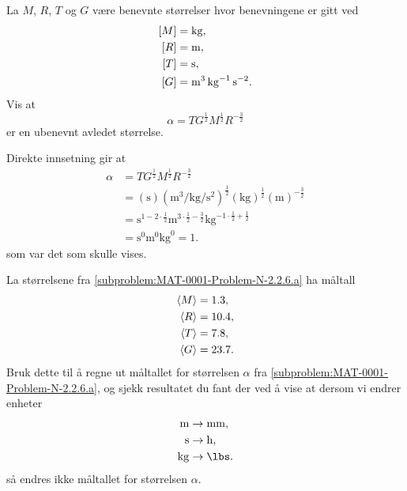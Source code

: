 \documentclass[a4paper,11pt]{article}
\begin{document}
\begin{problem}
    \begin{subproblem}
        \label{subproblem:MAT-0001-Problem-N-2.2.6.a}
        La $M$, $R$, $T$ og
        $G$ være benevnte størrelser hvor benevningene er
        gitt ved
        \begin{align*}
          \bpar{M} &= \si{\kg},\\
          \bpar{R} &= \si{\m},\\
          \bpar{T} &= \si{\s},\\
          \bpar{G} &= \si{\m\cubed\per\kg\per\s\squared}.
        \end{align*}
        Vis at
        \begin{equation*}
          \alpha = T G^{\frac{1}{2}} M^{\frac{1}{2}} R^{-\frac{3}{2}}
        \end{equation*}
        er en ubenevnt avledet størrelse.
    \end{subproblem}
\end{problem}
\begin{solution}
    Direkte innsetning gir at
    \begin{align*}
        \alpha 
        & = T G^{\frac{1}{2}} M^{\frac{1}{2}} R^{-\frac{3}{2}} \\
        & = (\si{\s})(\si{\m\cubed\per\kg\per\s\squared})^{\frac{1}{2}} (\si{\kg})^{\frac{1}{2}} (\si{\m})^{-\frac{3}{2}} \\
        & = \si{\s\tothe{1 - 2\cdot\frac{1}{2}}%
                \m\tothe{3 \cdot \frac{1}{2} - \frac{3}{2}}%
                \kg\tothe{-1\cdot\frac{1}{2}+\frac{1}{2}}} \\
        & = \si{\s\tothe{0}\m\tothe{0}\kg\tothe{0}}
          = 1.
    \end{align*}
    som var det som skulle vises.
\end{solution}
    \begin{subproblem}
        La størrelsene fra \cref{subproblem:MAT-0001-Problem-N-2.2.6.a} ha måltall
        \begin{align*}
          \langle M\rangle &= \num{1.3},\\
          \langle R\rangle &= \num{10.4},\\
          \langle T\rangle &= \num{7.8},\\
          \langle G\rangle &= \num{23.7}.
        \end{align*}
        Bruk dette til å regne ut måltallet for størrelsen $\alpha$ fra \cref{subproblem:MAT-0001-Problem-N-2.2.6.a},
        og sjekk resultatet du fant der ved å vise at dersom vi endrer enheter
        \begin{align*}
          \si{\m}&\rightarrow \si{\milli\m},\\
          \si{\s}&\rightarrow \si{\hour},\\
          \si{\kg}&\rightarrow \si{\lbs}.
        \end{align*}
        så endres ikke måltallet for størrelsen $\alpha$.
    \end{subproblem}
\end{document}
